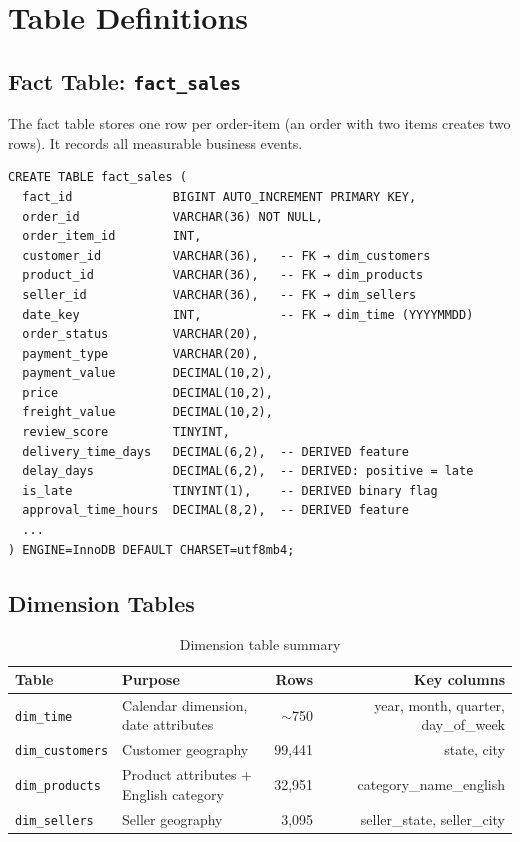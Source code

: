 \documentclass[12pt,a4paper]{report}
\begin{document}
\section{Table Definitions}

\subsection{Fact Table: \texttt{fact\_sales}}

The fact table stores one row per order-item (an order with two items creates two rows). It
records all measurable business events.

\begin{lstlisting}[style=sqlcode, caption={fact\_sales DDL excerpt}, label={lst:fact}]
CREATE TABLE fact_sales (
  fact_id              BIGINT AUTO_INCREMENT PRIMARY KEY,
  order_id             VARCHAR(36) NOT NULL,
  order_item_id        INT,
  customer_id          VARCHAR(36),   -- FK → dim_customers
  product_id           VARCHAR(36),   -- FK → dim_products
  seller_id            VARCHAR(36),   -- FK → dim_sellers
  date_key             INT,           -- FK → dim_time (YYYYMMDD)
  order_status         VARCHAR(20),
  payment_type         VARCHAR(20),
  payment_value        DECIMAL(10,2),
  price                DECIMAL(10,2),
  freight_value        DECIMAL(10,2),
  review_score         TINYINT,
  delivery_time_days   DECIMAL(6,2),  -- DERIVED feature
  delay_days           DECIMAL(6,2),  -- DERIVED: positive = late
  is_late              TINYINT(1),    -- DERIVED binary flag
  approval_time_hours  DECIMAL(8,2),  -- DERIVED feature
  ...
) ENGINE=InnoDB DEFAULT CHARSET=utf8mb4;
\end{lstlisting}

\subsection{Dimension Tables}

\begin{table}[H]
  \centering
  \caption{Dimension table summary}
  \label{tab:dims}
  \renewcommand{\arraystretch}{1.3}
  \begin{tabularx}{\textwidth}{lXrr}
    \toprule
    \textbf{Table} & \textbf{Purpose} & \textbf{Rows} & \textbf{Key columns} \\
    \midrule
    \texttt{dim\_time}      & Calendar dimension, date attributes & $\sim$750 & year, month, quarter, day\_of\_week \\
    \texttt{dim\_customers} & Customer geography                  & 99,441    & state, city \\
    \texttt{dim\_products}  & Product attributes + English category & 32,951  & category\_name\_english \\
    \texttt{dim\_sellers}   & Seller geography                    & 3,095     & seller\_state, seller\_city \\
    \bottomrule
  \end{tabularx}
\end{table}
\end{document}
